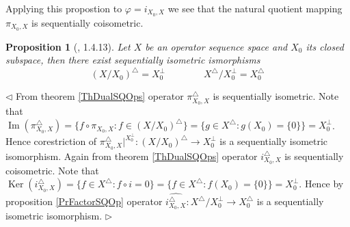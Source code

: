 \documentclass[12pt]{article}
\newtheorem{proposition}[theorem]{Proposition}
\newenvironment{proof}{\par $\triangleleft$}{$\triangleright$}
\begin{document}
Applying this propostion to $\varphi=i_{X_0,X}$ we see that the natural quotient mapping $\pi_{X_0,X}$ is sequentially coisometric.

\begin{proposition}[\cite{LamOpFolgen}, 1.4.13]\label{PrDualForQuotsAndSubsp} Let $X$ be an operator sequence space and $X_0$ its closed subspace, then there exist sequentially isometric ismorphisms
$$
(X/X_0)^\triangle= X_0^\perp\qquad\qquad X^\triangle/X_0^\perp=X_0^\triangle
$$
\end{proposition}
\begin{proof} From theorem \ref{ThDualSQOps} operator $\pi_{X_0,X}^\triangle$ is sequentially isometric. Note that $\operatorname{Im}(\pi_{X_0,X}^\triangle)=\{f\circ\pi_{X_0,X}:f\in (X/X_0)^\triangle\}=\{g\in X^\triangle: g(X_0)=\{0\}\}=X_0^\perp$. Hence corestriction of $\pi_{X_0,X}^\triangle|^{X_0^\perp}:(X/X_0)^\triangle\to X_0^\perp$ is a sequentially isometric isomorphism. Again from theorem \ref{ThDualSQOps} operator $i_{X_0,X}^\triangle$ is sequentially coisometric. Note that $\operatorname{Ker}(i_{X_0,X}^\triangle)=\{f\in X^\triangle:f\circ i=0\}=\{f\in X^\triangle: f(X_0)=\{0\}\}=X_0^\perp$. Hence by proposition \ref{PrFactorSQOp} operator $\widehat{i_{X_0,X}^\triangle}:X^\triangle/X_0^\perp\to X_0^\triangle$ is a sequentially isometric isomorphism.
\end{proof}
\end{document}
